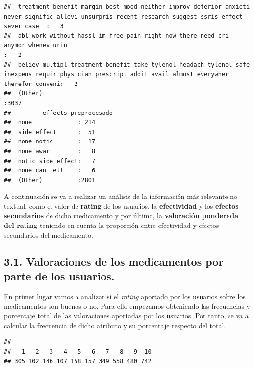 \documentclass[spanish,]{article}
\newenvironment{Shaded}{\begin{snugshade}}{\end{snugshade}}
\newcommand{\KeywordTok}[1]{\textcolor[rgb]{0.13,0.29,0.53}{\textbf{#1}}}
\newcommand{\CommentTok}[1]{\textcolor[rgb]{0.56,0.35,0.01}{\textit{#1}}}
\newcommand{\OperatorTok}[1]{\textcolor[rgb]{0.81,0.36,0.00}{\textbf{#1}}}
\newcommand{\NormalTok}[1]{#1}
\begin{document}
\begin{verbatim}
##  treatment benefit margin best mood neither improv deterior anxieti never signific allevi unsurpris recent research suggest ssris effect sever case  :   3     
##  abl work without hassl im free pain right now there need cri anymor whenev urin                                                                     :   2     
##  believ multipl treatment benefit take tylenol headach tylenol safe inexpens requir physician prescript addit avail almost everywher therefor conveni:   2     
##  (Other)                                                                                                                                             :3037     
##         effects_preprocesado
##  none             : 214     
##  side effect      :  51     
##  none notic       :  17     
##  none awar        :   8     
##  notic side effect:   7     
##  none can tell    :   6     
##  (Other)          :2801
\end{verbatim}

A continuación se va a realizar un análisis de la información más
relevante no textual, como el valor de \textbf{rating} de los usuarios,
la \textbf{efectividad} y los \textbf{efectos secundarios} de dicho
medicamento y por último, la \textbf{valoración ponderada del rating}
teniendo en cuenta la proporción entre efectividad y efectos secundarios
del medicamento.

\subsection{3.1. Valoraciones de los medicamentos por parte de los
usuarios.}\label{valoraciones-de-los-medicamentos-por-parte-de-los-usuarios.}

En primer lugar vamos a analizar si el \emph{rating} aportado por los
usuarios sobre los medicamentos son buenos o no. Para ello empezamos
obteniendo las frecuencias y porcentaje total de las valoraciones
aportadas por los usuarios. Por tanto, se va a calcular la frecuencia de
dicho atributo y su porcentaje respecto del total.

\begin{Shaded}
\end{Shaded}

\begin{verbatim}
## 
##   1   2   3   4   5   6   7   8   9  10 
## 305 102 146 107 158 157 349 558 480 742
\end{verbatim}
\end{document}
